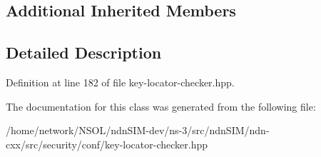 \subsection*{Additional Inherited Members}


\subsection{Detailed Description}


Definition at line 182 of file key-\/locator-\/checker.\+hpp.



The documentation for this class was generated from the following file\+:\begin{DoxyCompactItemize}
\item 
/home/network/\+N\+S\+O\+L/ndn\+S\+I\+M-\/dev/ns-\/3/src/ndn\+S\+I\+M/ndn-\/cxx/src/security/conf/key-\/locator-\/checker.\+hpp\end{DoxyCompactItemize}
